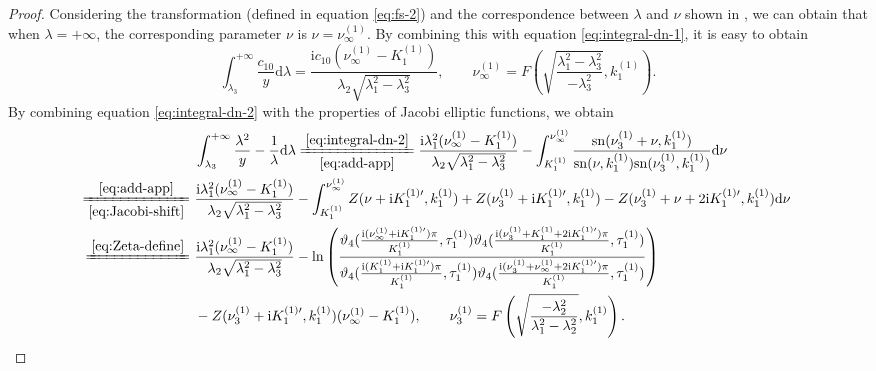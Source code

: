 \documentclass[11pt,reqno]{amsart}
\newcommand{\ii}{\mathrm{i}}
\newcommand{\sn}{\mathrm{sn}}
\newcommand{\dd}{\mathrm{d}}
\numberwithin{equation}{section}
\begin{document}
\begin{proof}
	Considering the transformation (defined  in equation \eqref{eq:fs-2}) and the correspondence between $\lambda$ and $\nu$ shown in , 
	we can obtain that when $\lambda=+\infty$, the corresponding parameter $\nu$ is $\nu= \nu^{(1)} _{\infty}$.
	By combining this with equation \eqref{eq:integral-dn-1}, it is easy to obtain 
	\begin{equation}\label{eq:define-nu-hat-infinity}
		\int_{\lambda_3}^{+\infty}\frac{c_{10}}{y}\dd \lambda=\frac{\ii c_{10}\left( \nu^{(1)}_{\infty}-  K^{(1)}_1\right)}{\lambda_2\sqrt{\lambda_1^2-\lambda_3^2}}
		, \qquad  
		\nu^{(1)} _{\infty}=F\left(\sqrt{\frac{\lambda_1^2-\lambda_3^2}{-\lambda_3^2}},  k^{(1)}_1\right).
	\end{equation}
	By combining equation \eqref{eq:integral-dn-2} with the properties of Jacobi elliptic functions, we obtain
	\begin{equation}\label{eq:int-infini-1}
		\begin{split}
			&\ \int_{\lambda_3}^{+\infty}\frac{\lambda^2}{y}-\frac{1}{\lambda}\dd \lambda
			\xlongequal[\eqref{eq:add-app}]{\eqref{eq:integral-dn-2}} \frac{\ii \lambda_1^2( \nu^{(1)} _{\infty}-  K^{(1)}_1) }{\lambda_2\sqrt{\lambda_1^2-\lambda_3^2}}
			-\int_{  K^{(1)}_1}^{ \nu^{(1)} _{\infty}}\frac{\sn( \nu^{(1)} _3+\nu,  k^{(1)}_1)}{\sn(\nu,  k^{(1)}_1)\sn(\nu^{(1)} _3,  k^{(1)}_1)}\dd \nu\\
			\!\!	\xlongequal[\eqref{eq:Jacobi-shift}]{\eqref{eq:add-app}}&\ \frac{\ii \lambda_1^2( \nu^{(1)} _{\infty}-  K^{(1)}_1) }{\lambda_2\sqrt{\lambda_1^2-\lambda_3^2}}
			-\int_{  K^{(1)}_1}^{ \nu^{(1)} _{\infty}}Z(\nu+\ii  K^{(1)\prime}_1,  k^{(1)}_1)+Z( \nu^{(1)} _3+\ii  K^{(1)\prime}_1,  k^{(1)}_1)-Z( \nu^{(1)} _3+\nu+2\ii  K^{(1)\prime}_1,  k^{(1)}_1)\dd \nu\\
			\xlongequal{\eqref{eq:Zeta-define}}&\ \frac{\ii \lambda_1^2( \nu^{(1)} _{\infty}-  K^{(1)}_1) }{\lambda_2\sqrt{\lambda_1^2-\lambda_3^2}}
			-\ln\left(\frac{\vartheta_4(\frac{\ii( \nu^{(1)} _{\infty}+\ii  K^{(1)\prime}_1)\pi}{  K^{(1)}_1},  \tau^{(1)}_1)\vartheta_4(\frac{\ii ( \nu^{(1)} _3+  K^{(1)}_1+2\ii  K^{(1)\prime}_1)\pi}{  K^{(1)}_1},  \tau^{(1)}_1)}{\vartheta_4(\frac{\ii(  K^{(1)}_1+\ii  K^{(1)\prime}_1)\pi}{  K^{(1)}_1},  \tau^{(1)}_1)\vartheta_4(\frac{\ii ( \nu^{(1)} _3+ \nu^{(1)} _{\infty}+2\ii  K^{(1)\prime}_1)\pi }{  K^{(1)}_1},  \tau^{(1)}_1)}\right)\\
			&\
			-Z( \nu^{(1)} _3+\ii  K^{(1)\prime}_1,  k^{(1)}_1)( \nu^{(1)} _{\infty}-  K^{(1)}_1), \qquad 
			\nu^{(1)} _3=F\left(\sqrt{\frac{-\lambda_2^2}{\lambda_1^2-\lambda_2^2}},  k^{(1)}_1\right).

\end{split}
\end{equation}
\end{proof}
\end{document}
